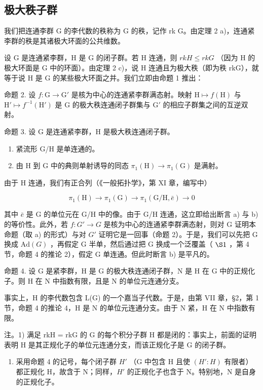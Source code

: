 \subsection{极大秩子群}

我们把连通李群 G 的李代数的秩称为 G 的秩，记作 rk G。由定理 2 a)，连通紧李群的秩是其诸极大环面的公共维数。

设 G 是连通紧李群，H 是 G 的闭子群。若 H 连通，则 \(rkH \leq rkG\) （因为 H 的极大环面是 G 中的环面）。由定理 2 c)，说 H 连通且为极大秩（即为秩 rkG），就等于说 H 是 G 的某些极大环面之并。我们立即由命题 1 推出：

命题 2. 设 \(f: \mathrm{G} \to \mathrm{G}'\) 是核为中心的连通紧李群满态射。映射 \(\mathrm{H} \mapsto f(\mathrm{H})\) 与 \(\mathrm{H}' \mapsto f^{-1}(\mathrm{H}')\) 是 \(\mathrm{G}\) 的极大秩连通闭子群集与 \(\mathrm{G}'\) 的相应子群集之间的互逆双射。

命题 3. 设 G 是连通紧李群，H 是极大秩连通闭子群。

\begin{enumerate}
\def\labelenumi{\alph{enumi})}
\item
  紧流形 G/H 是单连通的。
\item
  由 H 到 G 中的典则单射诱导的同态 \(\pi_1(\mathrm{H})\to \pi_1(\mathrm{G})\) 是满射。
\end{enumerate}

由于 H 连通，我们有正合列（《一般拓扑学》，第 XI 章，编写中）

\[
\pi_ {1} (\mathrm{H}) \rightarrow \pi_ {1} (\mathrm{G}) \rightarrow \pi_ {1} (\mathrm{G/H}, \bar {e}) \rightarrow 0
\]

其中 \(\bar{e}\) 是 G 的单位元在 G/H 中的像。由于 G/H 连通，这立即给出断言 a) 与 b) 的等价性。此外，若 \(f : G' \to G\) 是核为中心的连通紧李群满态射，则对 G 证明本命题（取 a) 的形式）与对 \(G'\) 证明它是一回事（命题 2）。于是，我们可以先把 G 换成 \(\text{Ad}(G)\) ，再假定 G 半单，然后通过把 G 换成一个泛覆盖（ \(\S1\) ，第 4 节，命题 4 的推论 2），假定 G 单连通。但此时断言 b) 是平凡的。

命题 4. 设 G 是紧李群，H 是 G 的极大秩连通闭子群，N 是 H 在 G 中的正规化子。则 H 在 N 中指数有限，且是 N 的单位元连通分支。

事实上，H 的李代数包含 L(G) 的一个嘉当子代数。于是，由第 VII 章，§2，第 1 节，命题 4 的推论 4，H 是 N 的单位元连通分支。由于 N 紧，H 在 N 中指数有限。

注。1) 满足 rkH = rkG 的 G 的每个积分子群 H 都是闭的：事实上，前面的证明表明 H 是其正规化子的单位元连通分支，而该正规化子是 G 的闭子群。

\begin{enumerate}
\def\labelenumi{\arabic{enumi})}
\setcounter{enumi}{1}
\tightlist
\item
  采用命题 4 的记号，每个闭子群 \(H'\) （G 中包含 H 且使 \((H':H)\) 有限者）都正规化 H，故含于 N；同样，\(H'\) 的正规化子也含于 N。特别地，N 是自身的正规化子。
\end{enumerate}

